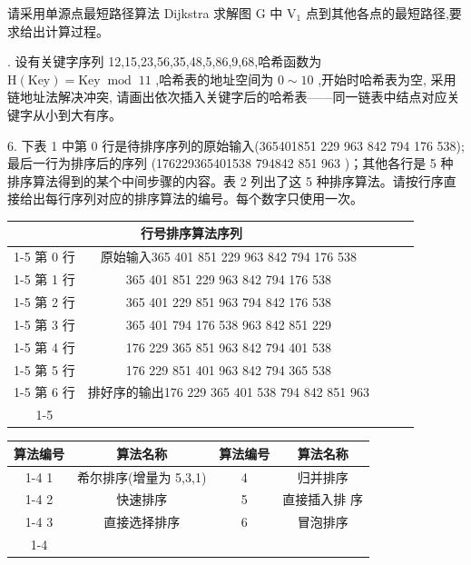 请采用单源点最短路径算法 Dijkstra 求解图 \(\mathrm{G}\) 中 \({\mathrm{V}}_{1}\) 点到其他各点的最短路径,要求给出计算过程。
\vspace{14em}

. 设有关键字序列 12,15,23,56,35,48,5,86,9,68,哈希函数为 \(\mathrm{H}\left( \mathrm{{Key}}\right)  = \mathrm{{Key}}{\;\operatorname{mod}\;{11}}\) ,哈希表的地址空间为 \(0 \sim  {10}\) ,开始时哈希表为空, 采用链地址法解决冲突, 请画出依次插入关键字后的哈希表——同一链表中结点对应关键字从小到大有序。
\vspace{14em}

6. 下表 1 中第 0 行是待排序序列的原始输入(365401851 229 963 842 794 176 538); 最后一行为排序后的序列 (176229365401538 794842 851 963 )；其他各行是 5 种排序算法得到的某个中间步骤的内容。表 2 列出了这 5 种排序算法。请按行序直接给出每行序列对应的排序算法的编号。每个数字只使用一次。

\begin{center}
\begin{tabular}{|c|c|c|c|c|}
\hline
\multicolumn{2}{|c|}{行号排序算法序列} & \phantom{X} & \phantom{X} & \phantom{X} \\
\cline{1-5}
第 0 行 & 原始输入365 401 851 229 963 842 794 176 538 & \phantom{X} & \phantom{X} & \phantom{X} \\
\cline{1-5}
第 1 行 & 365 401 851 229 963 842 794 176 538 & \phantom{X} & \phantom{X} & \phantom{X} \\
\cline{1-5}
第 2 行 & 365 401 229 851 963 794 842 176 538 & \phantom{X} & \phantom{X} & \phantom{X} \\
\cline{1-5}
第 3 行 & 365 401 794 176 538 963 842 851 229 & \phantom{X} & \phantom{X} & \phantom{X} \\
\cline{1-5}
第 4 行 & 176 229 365 851 963 842 794 401 538 & \phantom{X} & \phantom{X} & \phantom{X} \\
\cline{1-5}
第 5 行 & 176 229 851 401 963 842 794 365 538 & \phantom{X} & \phantom{X} & \phantom{X} \\
\cline{1-5}
第 6 行 & 排好序的输出176 229 365 401 538 794 842 851 963 & \phantom{X} & \phantom{X} & \phantom{X} \\
\cline{1-5}
\hline
\end{tabular}
\end{center}

\begin{center}
\begin{tabular}{|c|c|c|c|}
\hline
算法编号 & 算法名称 & 算法编号 & 算法名称 \\
\cline{1-4}
1 & 希尔排序(增量为 5,3,1) & 4 & 归并排序 \\
\cline{1-4}
2 & 快速排序 & 5 & 直接插入排 序 \\
\cline{1-4}
3 & 直接选择排序 & 6 & 冒泡排序 \\
\cline{1-4}
\hline
\end{tabular}
\end{center}
\vspace{14em}

